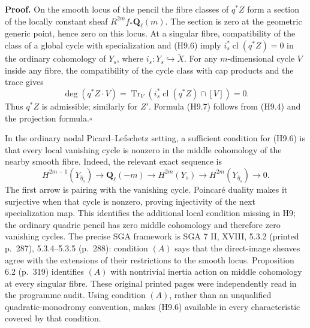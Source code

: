 \documentclass[11pt,a4paper]{article}
\begin{document}
\textbf{Proof.} On the smooth locus of the pencil the fibre classes of
$q^*Z$ form a section of the locally constant sheaf
$R^{2m}f_*\mathbf Q_\ell(m)$. The section is zero at the geometric generic
point, hence zero on this locus. At a singular fibre, compatibility of the
class of a global cycle with specialization and (H9.6) imply
$i_s^*\operatorname{cl}(q^*Z)=0$ in the ordinary cohomology of $Y_s$,
where $i_s:Y_s\hookrightarrow\widetilde X$. For any $m$-dimensional cycle $V$
inside any fibre, the compatibility of the cycle class with cap products
and the trace gives
\[
 \deg(q^*Z\cdot V)=
 \operatorname{Tr}_{V}(i_s^*\operatorname{cl}(q^*Z)\cap[V])=0.
\]
Thus $q^*Z$ is admissible; similarly for $Z'$. Formula (H9.7) follows
from (H9.4) and the projection formula.\hfill$\square$

In the ordinary nodal Picard--Lefschetz setting, a sufficient condition
for (H9.6) is that every local vanishing cycle is nonzero in the middle
cohomology of the nearby smooth fibre. Indeed, the relevant exact sequence
is
\[
 H^{2m-1}(Y_{\bar\eta_s})\longrightarrow\mathbf Q_\ell(-m)
 \longrightarrow H^{2m}(Y_s)
 \longrightarrow H^{2m}(Y_{\bar\eta_s})\longrightarrow0.
\]
The first arrow is pairing with the vanishing cycle. Poincar\'e duality
makes it surjective when that cycle is nonzero, proving injectivity of the
next specialization map. This identifies the additional local condition
missing in H9; the ordinary quadric pencil has zero middle cohomology and
therefore zero vanishing cycles. The precise SGA framework is SGA 7 II,
XVIII, 5.3.2 (printed p.~287), 5.3.4--5.3.5 (p.~288): condition $(A)$ says
that the direct-image sheaves agree with the extensions of their
restrictions to the smooth locus. Proposition 6.2 (p.~319) identifies
$(A)$ with nontrivial inertia action on middle cohomology at every
singular fibre. These original printed pages were independently read in
the programme audit. Using condition $(A)$, rather than an unqualified
quadratic-monodromy convention, makes (H9.6) available in every
characteristic covered by that condition.
\end{document}
